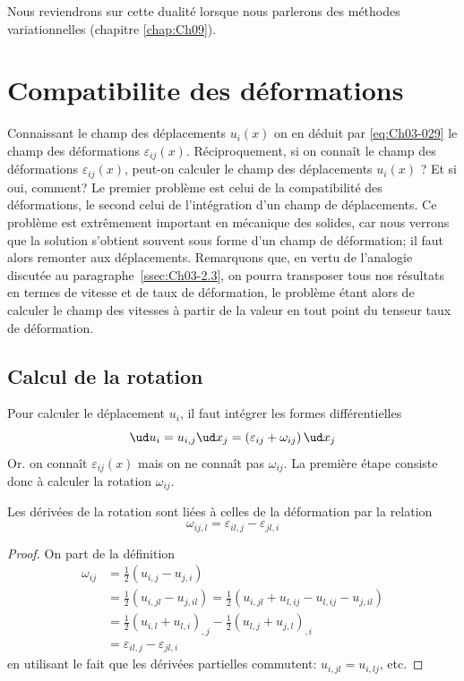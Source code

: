 Nous reviendrons sur cette dualité lorsque nous parlerons des méthodes variationnelles (chapitre \ref{chap:Ch09}).
\section{Compatibilite des déformations} \label{sec:Ch03-3}
Connaissant le champ des déplacements $u_i (x)$ on en déduit par \eqref{eq:Ch03-029} le champ des déformations $\varepsilon_{ij}(x)$.
Réciproquement, si on connaît le champ des déformations $\varepsilon_{ij}(x)$, peut-on calculer le champ des déplacements $u_i (x)$ ?
Et si oui, comment?
Le premier problème est celui de la compatibilité des déformations, le second celui de l'intégration d'un champ de déplacements.
Ce problème est extrêmement important en mécanique des solides, car nous verrons que la solution s'obtient souvent sous forme d'un champ de déformation; il faut alors remonter aux déplacements.
Remarquons que, en vertu de l'analogie discutée au paragraphe~\ref{ssec:Ch03-2.3}, on pourra transposer tous nos résultats en termes de vitesse et de taux de déformation, le problème étant alors de calculer le champ des vitesses à partir de la valeur en tout point du tenseur taux de déformation.
\subsection{Calcul de la rotation} \label{ssec:Ch03-3.1}
Pour calculer le déplacement $u_i$, il faut intégrer les formes différentielles 
\begin{equation}
    \ud u_i = u_{i,j} \ud x_j = \left( \varepsilon_{ij} + \omega_{ij} \right) \ud x_j
    \label{eq:Ch03-051}
\end{equation}
Or. on connaît $\varepsilon_{ij}(x)$ mais on ne connaît pas $\omega_{ij}$.
La première étape consiste donc à calculer la rotation $\omega_{ij}$.
\begin{lem} \label{lem:Ch03-1}
    Les dérivées de la rotation sont liées à celles de la déformation par la relation
    \begin{equation}
        \omega_{ij,l} = \varepsilon_{il,j} - \varepsilon_{jl,i}
        \label{eq:Ch03-052}
    \end{equation}
\end{lem}
\begin{proof}
    On part de la définition 
    \begin{align*}
        \omega_{ij} &= \frac{1}{2} \left( u_{i,j} - u_{j,i} \right) \\
        &= \frac{1}{2} \left( u_{i,jl} - u_{j,il} \right) = \frac{1}{2} \left( u_{i,jl} + u_{l,ij} - u_{l,ij} - u_{j,il} \right) \\
        &= \frac{1}{2} \left( u_{i,l} + u_{l,i} \right)_{,j} - \frac{1}{2} \left( u_{l,j} + u_{j,l} \right)_{,i} \\
        &= \varepsilon_{il,j} - \varepsilon_{jl,i}
    \end{align*}
    en utilisant le fait que les dérivées partielles commutent: $u_{i,jl} = u_{i,lj}$, etc.
\end{proof}

